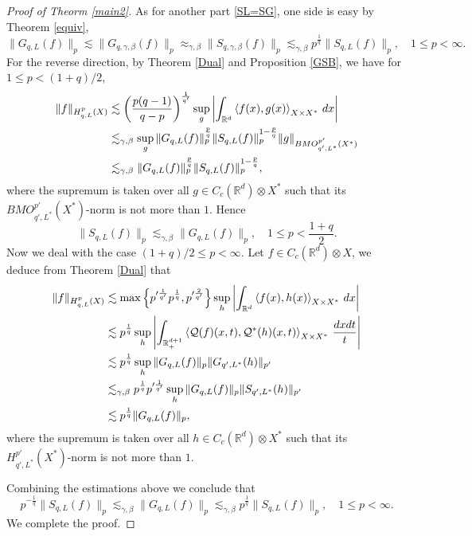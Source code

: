 \documentclass[oneside,english,a4wide]{amsart}
\numberwithin{equation}{section}
\numberwithin{figure}{section}
\theoremstyle{plain}
\theoremstyle{plain}
\theoremstyle{definition}
\theoremstyle{plain}
\theoremstyle{remark}
\theoremstyle{definition}
\theoremstyle{remark}
\theoremstyle{definition}
\newcommand{\real}{{\mathbb R}}
\newcommand{\Q}{{\mathcal Q}}
\newcommand{\8}{+\infty}
\renewcommand{\1}{\mathbbm{1}}
\newcommand\jdz[1]{ \left| #1 \right| }
\newcommand\sk[1]{ \left( #1 \right) }
\newcommand\lk[1]{ \left\{ #1 \right\} }
\newcommand{\lara}[1]{\left\langle #1 \right\rangle}
\renewcommand\d{{\rm d}}
\begin{document}
{\begin{proof}[Proof of Theorm \ref{main2}]
    As for another part \eqref{SL=SG}, one side is easy by Theorem \ref{equiv},
    \[
        \| G_{q,L}(f) \|_p \lesssim \| G_{q, \gamma, \beta}(f) \|_p \approx_{\gamma, \beta} \| 
        S_{q, \gamma, \beta}(f) \|_p \lesssim_{\gamma, \beta} p^{\frac{1}{q}}\| S_{q,L}(f) \|_p, \quad 1 \leq p < \infty.
    \]   
    For the reverse direction, by Theorem \ref{Dual} and Proposition \ref{GSB}, we have for $1 \leq p < (1+q)/2$,
    \[
    \begin{aligned}
        \| f \|_{H^p_{q, L}(X) } & \lesssim \sk{ \frac{p(q-1)}{q-p} }^{\frac{1}{q'}}\sup_{ g } \jdz{ \int_{\real^d} \lara{f(x), g(x)}_{X \times X^*} \,\d x }\\
        & \lesssim_{\gamma, \beta} \sup_{ g } \| G_{q,L}(f) \|_p^{\frac{p}{q}}\| S_{q,L}(f) \|_p^{1- \frac{p}{q}} \| g \|_{BMO^{p'}_{q', L^*}(X^*)} \\
        & \lesssim_{\gamma, \beta} \| G_{q,L}(f) \|_p^{\frac{p}{q}}\| S_{q,L}(f) \|_p^{1- \frac{p}{q}},
    \end{aligned}
    \]
    where the supremum is taken over all $g\in C_c(\mathbb R^d)\otimes X^*$ such that  its $BMO_{q', L^*}^{p'}(X^*)$-norm is not more than $1$. Hence
    \[
        \| S_{q,L}(f) \|_p \lesssim_{\gamma, \beta} \| G_{q,L}(f) \|_p, \quad 1 \leq p < \frac{1+q}{2}.
    \]
    Now we deal with the case $(1+q)/2 \leq p < \infty$. Let $f\in C_c(\real^d)\otimes X$, we deduce from Theorem \ref{Dual} that
    \[
    \begin{aligned}
        \| f \|_{H^p_{q, L}(X)} & \lesssim \max\lk{ p'^{\frac{1}{q'}}p^{\frac{1}{q}}, p'^{\frac{2}{q'}} } \sup_{ h } \jdz{ \int_{ \real^d }\lara{f(x), h(x)}_{X \times X^*} \,\d x } \\
        & \lesssim p^{\frac{1}{q}}\sup_{ h } \jdz{ \int_{ \real^{d + 1}_+ }\lara{\Q(f)(x, t), \Q^*(h)(x, t)}_{X \times X^*} \,\frac{\d x\d t}{t} } \\
        & \lesssim p^{\frac{1}{q}} \sup_{ h } \| G_{q,L}(f) \|_p\| G_{q', L^*}(h) \|_{p'} \\
        & \lesssim_{\gamma, \beta} p^{\frac{1}{q}}p'^{\frac{1}{q'}} \sup_{ h } \| G_{q,L}(f) \|_p\| S_{q', L^*}(h) \|_{p'} \\
        & \lesssim p^{\frac{1}{q}}\| G_{q,L}(f) \|_p,
    \end{aligned}
    \]
    where the supremum is taken over all $h\in C_c(\real^d)\otimes X^*$ such that its $H^{p'}_{q', L^*}(X^*)$-norm is not more than $1$. 

    Combining the estimations above we conclude that 
    \[
        p^{-\frac{1}{q}}\| S_{q,L}(f) \|_p \lesssim_{\gamma, \beta} \| G_{q,L}(f) \|_p \lesssim_{\gamma, \beta} p^{\frac{1}{q}}\| S_{q,L}(f) \|_p, \quad  1 \leq p < \infty.
    \]
    We complete the proof.
\end{proof}

}
\end{document}
